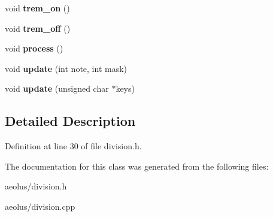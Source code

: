 \begin{DoxyCompactItemize}
\item 
\mbox{\label{class_division_a3d24a51714fe181d4ee8d6aca7955ab5}} 
void {\bfseries trem\+\_\+on} ()
\item 
\mbox{\label{class_division_a41b53ab6d5240d9265f6ad257837ddec}} 
void {\bfseries trem\+\_\+off} ()
\item 
\mbox{\label{class_division_a538e4f741de24c1d06af89650e4ecc6a}} 
void {\bfseries process} ()
\item 
\mbox{\label{class_division_a103b2b362aaec5c8adc586154ac66314}} 
void {\bfseries update} (int note, int mask)
\item 
\mbox{\label{class_division_ab2a17be93d45eaf080d77767a57d8410}} 
void {\bfseries update} (unsigned char $\ast$keys)
\end{DoxyCompactItemize}


\subsection{Detailed Description}


Definition at line 30 of file division.\+h.



The documentation for this class was generated from the following files\+:\begin{DoxyCompactItemize}
\item 
aeolus/division.\+h\item 
aeolus/division.\+cpp\end{DoxyCompactItemize}
